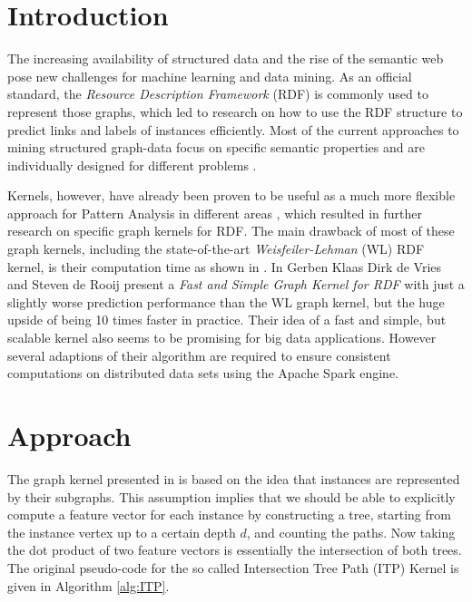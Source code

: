\documentclass{easychair}
\begin{document}
\setcounter{tocdepth}{2}
\pagestyle{empty}

\section{Introduction}
\label{sect:Introduction}
The increasing availability of structured data and the rise of the semantic web pose new challenges for machine learning and data mining. As an official standard, the \textit{Resource Description Framework} (RDF) is commonly used to represent those graphs, which led to research on how to use the RDF structure to predict links and labels of instances efficiently. Most of the current approaches to mining structured graph-data focus on specific semantic properties and are individually designed for different problems \cite{Rettinger2009, Huang2011}.

Kernels, however, have already been proven to be useful as a much more flexible approach for Pattern Analysis in different areas \cite{Shawe-Taylor2004}, which resulted in further research on specific graph kernels for RDF. The main drawback of most of these graph kernels, including the state-of-the-art \textit{Weisfeiler-Lehman} (WL) RDF kernel, is their computation time as shown in \cite{deVries2013}. In \cite{FGK} Gerben Klaas Dirk de Vries and Steven de Rooij present a \textit{Fast and Simple Graph Kernel for RDF} with just a slightly worse prediction performance than the WL graph kernel, but the huge upside of being 10 times faster in practice. Their idea of a fast and simple, but scalable kernel also seems to be promising for big data applications. However several adaptions of their algorithm are required to ensure consistent computations on distributed data sets using the Apache Spark engine.

\section{Approach}
\label{sect:Approach}

The graph kernel presented in \cite{FGK} is based on the idea that instances are represented by their subgraphs. This assumption implies that we should be able to explicitly compute a feature vector for each instance by constructing a tree, starting from the instance vertex up to a certain depth $d$, and counting the paths. Now taking the dot product of two feature vectors is essentially the intersection of both trees. The original pseudo-code for the so called Intersection Tree Path (ITP) Kernel is given in Algorithm \ref{alg:ITP}.
\end{document}
